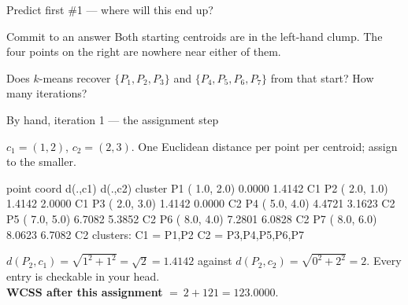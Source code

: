 \documentclass[aspectratio=169]{beamer}
\begin{document}
\begin{frame}{Predict first \#1 --- where will this end up?}
  \begin{alertblock}{Commit to an answer}
    Both starting centroids are in the left-hand clump. The four points on
    the right are nowhere near either of them.

    \medskip
    \centering\large
    Does $k$-means recover $\{P_1,P_2,P_3\}$ and $\{P_4,P_5,P_6,P_7\}$
    from that start? How many iterations?
  \end{alertblock}
\end{frame}

\begin{frame}[fragile,shrink=6]{By hand, iteration 1 --- the assignment step}
  \begin{center}\small
    $c_1 = (1,2)$, $c_2 = (2,3)$. One Euclidean distance per point per
    centroid; assign to the smaller.
  \end{center}
\begin{outblk}
  point      coord      d(.,c1)   d(.,c2)   cluster
  P1     ( 1.0, 2.0)    0.0000    1.4142   C1
  P2     ( 2.0, 1.0)    1.4142    2.0000   C1
  P3     ( 2.0, 3.0)    1.4142    0.0000   C2
  P4     ( 5.0, 4.0)    4.4721    3.1623   C2
  P5     ( 7.0, 5.0)    6.7082    5.3852   C2
  P6     ( 8.0, 4.0)    7.2801    6.0828   C2
  P7     ( 8.0, 6.0)    8.0623    6.7082   C2
  clusters: C1 = {P1,P2}   C2 = {P3,P4,P5,P6,P7}
\end{outblk}
  \vspace{0.2em}
  \begin{center}\small
    $d(P_2,c_1) = \sqrt{1^2+1^2} = \sqrt{2} = 1.4142$ against
    $d(P_2,c_2) = \sqrt{0^2+2^2} = 2$. Every entry is checkable in your head.
    \\[0.2em]
    \textbf{WCSS after this assignment} $=\ 2 + 121 = \mathbf{123.0000}$.
  \end{center}
\end{frame}
\end{document}
